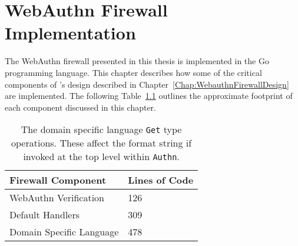 

\chapter{WebAuthn Firewall Implementation}\label{Chap:WebauthnFirewallImplementation}

The WebAuthn firewall presented in this thesis is implemented in the Go programming language. This chapter describes how some of the critical components of \sys{}'s design described in Chapter~\ref{Chap:WebauthnFirewallDesign} are implemented. The following Table~\ref{Table:ImplementationFootprint} outlines the approximate footprint of each component discussed in this chapter.

\begin{table}[h]
\centering

\begin{tabular}{ m{5cm} m{3cm}  } 
 \hline
 Firewall Component & Lines of Code \\ 
 \hline \hline

 WebAuthn Verification & 126 \\ \hline

 Default Handlers & 309 \\ \hline

 Domain Specific Language & 478 \\ \hline

\end{tabular}
\caption{The domain specific language \lstinline{Get} type operations. These affect the format string if invoked at the top level within \lstinline|Authn|.}
\label{Table:ImplementationFootprint}
\end{table}


